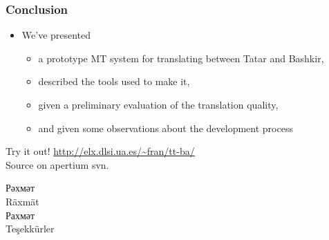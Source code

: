 \documentclass[10pt,xetex]{beamer} %
\begin{document}
\begin{frame}
  \frametitle{Conclusion}

\begin{block} %

  \begin{itemize}
    \item We've presented
    \begin{itemize}
      \item a prototype MT system for translating between Tatar and Bashkir,
      \item described the tools used to make it,
      \item given a preliminary evaluation of the translation quality,
      \item and given some observations about the development process
    \end{itemize}
  \end{itemize}


\end{block}

\begin{center}
Try it out! \url{http://elx.dlsi.ua.es/~fran/tt-ba/}\\
Source on apertium svn.
\end{center}

\end{frame}

\begin{frame}

\begin{Huge}
\begin{center}
Рәхмәт \\ 
Räxmät \\
Рахмәт \\ 
Teşekkürler\\
~\\
\smiley
\end{center}
\end{Huge}
\end{frame}

\begin{frame}


\end{frame}
%
\end{document}
